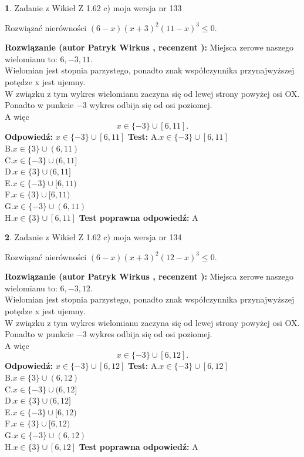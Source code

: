 \documentclass[12pt, a4paper]{article}
\theoremstyle{definition} %
\newtheorem{zad}{}
\newcommand{\zadStart}[1]{\begin{zad}#1\newline}
\newcommand{\zadStop}{\end{zad}}
\newcommand{\rozwStart}[2]{\noindent \textbf{Rozwiązanie (autor #1 , recenzent #2): }\newline}
\newcommand{\rozwStop}{\newline}
\newcommand{\odpStart}{\noindent \textbf{Odpowiedź:}\newline}
\newcommand{\odpStop}{\newline}
\newcommand{\testStart}{\noindent \textbf{Test:}\newline}
\newcommand{\testStop}{\newline}
\newcommand{\kluczStart}{\noindent \textbf{Test poprawna odpowiedź:}\newline}
\newcommand{\kluczStop}{\newline}
\begin{document}
\zadStart{Zadanie z Wikieł Z 1.62 c) moja wersja nr 133}

Rozwiązać nierówności $(6-x)(x+3)^{2}(11-x)^{3}\le0$.
\zadStop
\rozwStart{Patryk Wirkus}{}
Miejsca zerowe naszego wielomianu to: $6, -3, 11$.\\
Wielomian jest stopnia parzystego, ponadto znak współczynnika przy\linebreak najwyższej potędze x jest ujemny.\\ W związku z tym wykres wielomianu zaczyna się od lewej strony powyżej osi OX.\\
Ponadto w punkcie $-3$ wykres odbija się od osi poziomej.\\
A więc $$x \in \{-3\} \cup [6,11].$$
\rozwStop
\odpStart
$x \in \{-3\} \cup [6,11]$
\odpStop
\testStart
A.$x \in \{-3\} \cup [6,11]$\\
B.$x \in \{3\} \cup (6,11)$\\
C.$x \in \{-3\} \cup (6,11]$\\
D.$x \in \{3\} \cup (6,11]$\\
E.$x \in \{-3\} \cup [6,11)$\\
F.$x \in \{3\} \cup [6,11)$\\
G.$x \in \{-3\} \cup (6,11)$\\
H.$x \in \{3\} \cup [6,11]$
\testStop
\kluczStart
A
\kluczStop



\zadStart{Zadanie z Wikieł Z 1.62 c) moja wersja nr 134}

Rozwiązać nierówności $(6-x)(x+3)^{2}(12-x)^{3}\le0$.
\zadStop
\rozwStart{Patryk Wirkus}{}
Miejsca zerowe naszego wielomianu to: $6, -3, 12$.\\
Wielomian jest stopnia parzystego, ponadto znak współczynnika przy\linebreak najwyższej potędze x jest ujemny.\\ W związku z tym wykres wielomianu zaczyna się od lewej strony powyżej osi OX.\\
Ponadto w punkcie $-3$ wykres odbija się od osi poziomej.\\
A więc $$x \in \{-3\} \cup [6,12].$$
\rozwStop
\odpStart
$x \in \{-3\} \cup [6,12]$
\odpStop
\testStart
A.$x \in \{-3\} \cup [6,12]$\\
B.$x \in \{3\} \cup (6,12)$\\
C.$x \in \{-3\} \cup (6,12]$\\
D.$x \in \{3\} \cup (6,12]$\\
E.$x \in \{-3\} \cup [6,12)$\\
F.$x \in \{3\} \cup [6,12)$\\
G.$x \in \{-3\} \cup (6,12)$\\
H.$x \in \{3\} \cup [6,12]$
\testStop
\kluczStart
A
\kluczStop
\end{document}

